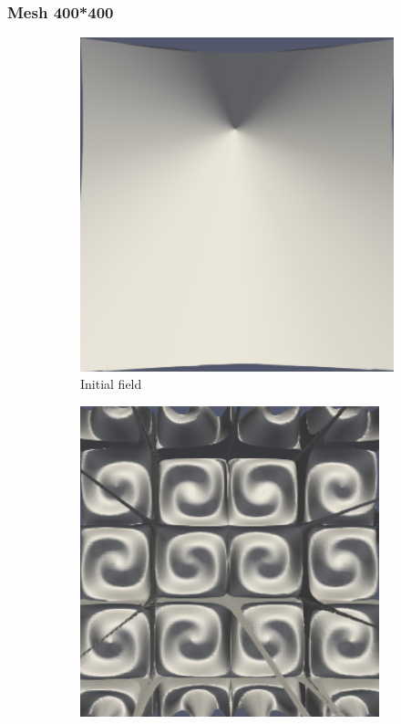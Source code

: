 \documentclass{article}
\begin{document}
\subsubsection{Mesh 400*400}
\begin{figure}[hbt!]
  \begin{subfigure}{0.4\textwidth}
        \centering
        \includegraphics[width=\textwidth]{Figures/e-4 400x400/for n 1.png}
        \caption{Initial field}
  \end{subfigure}
  \hfill
  \begin{subfigure}{0.4\textwidth}
        \centering
        \includegraphics[width=\textwidth]{Figures/e-4 400x400/for n 10.png}

\end{subfigure}
\end{figure}
\end{document}
